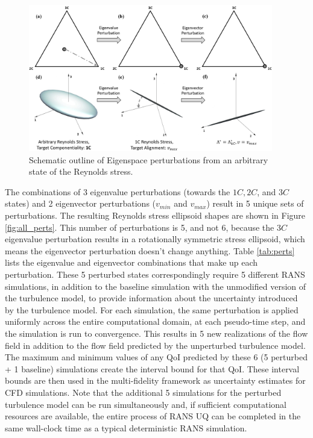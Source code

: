 \begin{figure}
    \center
    \includegraphics[width=0.95\textwidth]{suthesis/images/eig_pert_1c.png}
    \caption{Schematic outline of Eigenspace perturbations from an arbitrary state of the Reynolds stress. \label{fig:pert_vis}}
\end{figure}

The combinations of 3 eigenvalue perturbations (towards the $1C, 2C$, and $3C$ states) and 2 eigenvector perturbations ($v_{min}$ and $v_{max}$) result in 5 unique sets of perturbations. The resulting Reynolds stress ellipsoid shapes are shown in Figure \ref{fig:all_perts}. This number of perturbations is 5, and not 6, because the $3C$ eigenvalue perturbation results in a rotationally symmetric stress ellipsoid, which means the eigenvector perturbation doesn't change anything. Table \ref{tab:perts} lists the eigenvalue and eigenvector combinations that make up each perturbation. These 5 perturbed states correspondingly require 5 different RANS simulations, in addition to the baseline simulation with the unmodified version of the turbulence model, to provide information about the uncertainty introduced by the turbulence model. For each simulation, the same perturbation is applied uniformly across the entire computational domain, at each pseudo-time step, and the simulation is run to convergence. This results in 5 new realizations of the flow field in addition to the flow field predicted by the unperturbed turbulence model. The maximum and minimum values of any QoI predicted by these 6 (5 perturbed + 1 baseline) simulations create the interval bound for that QoI. These interval bounds are then used in the multi-fidelity framework as uncertainty estimates for CFD simulations. Note that the additional 5 simulations for the perturbed turbulence model can be run simultaneously and, if sufficient computational resources are available, the entire process of RANS UQ can be completed in the same wall-clock time as a typical deterministic RANS simulation.

